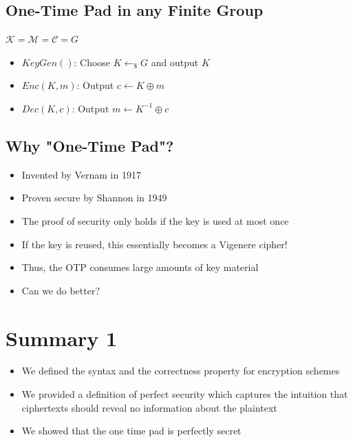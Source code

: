    		 \subsection{One-Time Pad in any Finite Group}
   		 	\begin{center}
   		 		$\mathcal{K} = \mathcal{M} = \mathcal{C} = G$
   		 	\end{center}
   		 	\begin{itemize}
   		 		\item $KeyGen()$: Choose $K \leftarrow_{\$} G$ and output $K$
   		 		\item $Enc(K,m)$: Output $c \leftarrow K \oplus m$
   		 		\item $Dec(K,c)$: Output $m \leftarrow K^{-1} \oplus c$
   		 	\end{itemize}
   		 
   		 \subsection{Why "One-Time Pad"?}
   		 	\begin{itemize}
   		 		\item Invented by Vernam in 1917
   		 		\item Proven secure by Shannon in 1949
   		 		\item The proof of security only holds if the key is used at most once
   		 		\item If the key is reused, this essentially becomes a Vigenere cipher!
   		 		\item Thus, the OTP consumes large amounts of key material
   		 		\item Can we do better?
   		 	\end{itemize}
	
	\section{Summary 1}
		\begin{itemize}
			\item We defined the syntax and the correctness property for encryption schemes
			\item We provided a definition of perfect security which captures the intuition that ciphertexts should reveal no information about the plaintext
			\item We showed that the one time pad is perfectly secret
		\end{itemize}
	
	
	
